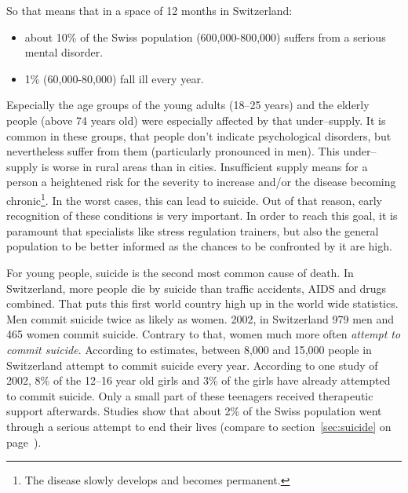 \documentclass[../main.tex]{subfiles}
\begin{document}
So that means that in a space of 12 months in Switzerland:
\begin{itemize}
	\item about 10\% of the Swiss population (600,000-800,000) suffers from a serious mental disorder.
	\item 1\% (60,000-80,000) fall ill every year.
\end{itemize}

Especially the age groups of the young adults (18--25 years) and the elderly people (above 74 years old) were especially affected by that under--supply. 
It is common in these groups, that people don't indicate psychological disorders, but nevertheless suffer from them (particularly pronounced in men). This under--supply is worse in rural areas than in cities.
Insufficient supply means for a person a heightened risk for the severity to increase and/or the disease becoming chronic\footnote{The disease slowly develops and becomes permanent.}. 
In the worst cases, this can lead to suicide.
Out of that reason, early recognition of these conditions is very important.
In order to reach this goal, it is paramount that specialists like stress regulation trainers, but also the general population to be better informed as the chances to be confronted by it are high.

For young people, suicide is the second most common cause of death. In Switzerland, more people die by suicide than traffic accidents, AIDS and drugs combined. 
That puts this first world country high up in the world wide statistics.
Men commit suicide twice as likely as women. 
2002, in Switzerland 979 men and 465 women commit suicide.
Contrary to that, women much more often \emph{attempt to commit suicide}.
According to estimates, between 8,000 and 15,000 people in Switzerland attempt to commit suicide every year.
According to one study of 2002, 8\% of the 12--16 year old girls and 3\% of the girls have already attempted to commit suicide.
Only a small part of these teenagers received therapeutic support afterwards.
Studies show that about 2\% of the Swiss population went through a serious attempt to end their lives (compare to section~\ref{sec:suicide} on page~\pageref{sec:suicide}). 
\end{document}
